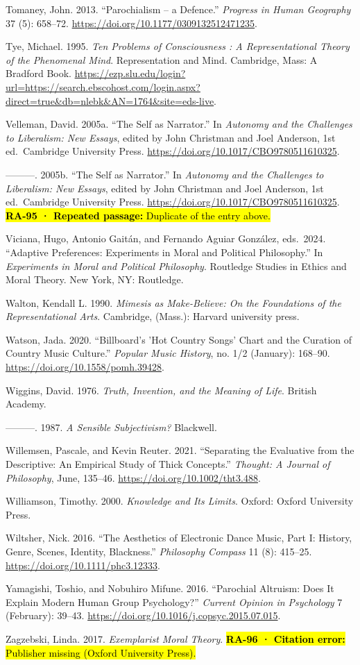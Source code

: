 \documentclass[
  letterpaper,
  DIV=11,
  numbers=noendperiod]{scrartcl}
\theoremstyle{remark}
\begin{document}
Tomaney, John. 2013. ``Parochialism -- a Defence.'' \emph{Progress in
Human Geography} 37 (5): 658--72.
\url{https://doi.org/10.1177/0309132512471235}.

Tye, Michael. 1995. \emph{Ten Problems of Consciousness : A
Representational Theory of the Phenomenal Mind}. Representation and
Mind. Cambridge, Mass: A Bradford Book.
\url{https://ezp.slu.edu/login?url=https://search.ebscohost.com/login.aspx?direct=true&db=nlebk&AN=1764&site=eds-live}.

Velleman, David. 2005a. ``The Self as Narrator.'' In \emph{Autonomy and
the Challenges to Liberalism: New Essays}, edited by John Christman and
Joel Anderson, 1st ed.~Cambridge University Press.
\url{https://doi.org/10.1017/CBO9780511610325}.

---------. 2005b. ``The Self as Narrator.'' In \emph{Autonomy and the
Challenges to Liberalism: New Essays}, edited by John Christman and Joel
Anderson, 1st ed.~Cambridge University Press.
\url{https://doi.org/10.1017/CBO9780511610325}. \hl{\textbf{RA-95 ·
Repeated passage:} Duplicate of the entry above.}

Viciana, Hugo, Antonio Gaitán, and Fernando Aguiar González, eds.~2024.
``Adaptive Preferences: Experiments in Moral and Political Philosophy.''
In \emph{Experiments in Moral and Political Philosophy}. Routledge
Studies in Ethics and Moral Theory. New York, NY: Routledge.

Walton, Kendall L. 1990. \emph{Mimesis as Make-Believe: On the
Foundations of the Representational Arts}. Cambridge, (Mass.): Harvard
university press.

Watson, Jada. 2020. ``Billboard's 'Hot Country Songs' Chart and the
Curation of Country Music Culture.'' \emph{Popular Music History}, no.
1/2 (January): 168--90. \url{https://doi.org/10.1558/pomh.39428}.

Wiggins, David. 1976. \emph{Truth, Invention, and the Meaning of Life}.
British Academy.

---------. 1987. \emph{A Sensible Subjectivism?} Blackwell.

Willemsen, Pascale, and Kevin Reuter. 2021. ``Separating the Evaluative
from the Descriptive: An Empirical Study of Thick Concepts.''
\emph{Thought: A Journal of Philosophy}, June, 135--46.
\url{https://doi.org/10.1002/tht3.488}.

Williamson, Timothy. 2000. \emph{Knowledge and Its Limits}. Oxford:
Oxford University Press.

Wiltsher, Nick. 2016. ``The Aesthetics of Electronic Dance Music, Part
I: History, Genre, Scenes, Identity, Blackness.'' \emph{Philosophy
Compass} 11 (8): 415--25. \url{https://doi.org/10.1111/phc3.12333}.

Yamagishi, Toshio, and Nobuhiro Mifune. 2016. ``Parochial Altruism: Does
It Explain Modern Human Group Psychology?'' \emph{Current Opinion in
Psychology} 7 (February): 39--43.
\url{https://doi.org/10.1016/j.copsyc.2015.07.015}.

Zagzebski, Linda. 2017. \emph{Exemplarist Moral Theory}.
\hl{\textbf{RA-96 · Citation error:} Publisher missing (Oxford
University Press).}
\end{document}
